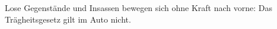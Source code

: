 Lose Gegenstände und Insassen bewegen sich ohne Kraft nach vorne: Das Trägheitsgesetz gilt im Auto nicht.
